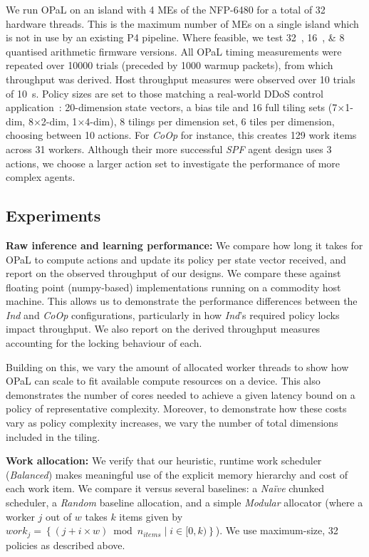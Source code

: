 \documentclass[sigconf,natbib=false]{acmart}
\newcommand{\fakepara}[1]{\noindent\textbf{#1:}}
\newcommand{\approachshort}{OPaL}
\newcommand{\Coopfw}{\emph{CoOp}}
\newcommand{\coopfw}{\Coopfw}
\newcommand{\Indfw}{\emph{Ind}}
\newcommand{\indfw}{\Indfw}
\begin{document}
We run \approachshort{} on an island with \num{4} MEs of the NFP-6480 for a total of \num{32} hardware threads.
This is the maximum number of MEs on a single island which is not in use by an existing P4 pipeline.
Where feasible, we test \SIlist{32;16;8}{\bit} quantised arithmetic firmware versions.
All \approachshort{} timing measurements were repeated over \num{10000} trials (preceded by \num{1000} warmup packets), from which throughput was derived.
Host throughput measures were observed over \num{10} trials of \SI{10}{\second}.
Policy sizes are set to those matching a real-world DDoS control application~\parencite{DBLP:journals/tnsm/SimpsonRP20}: 20-dimension state vectors, a bias tile and 16 full tiling sets (7$\times$1-dim, 8$\times$2-dim, 1$\times$4-dim), 8 tilings per dimension set, 6 tiles per dimension, choosing between 10 actions.
For \Coopfw{} for instance, this creates \num{129} work items across \num{31} workers.
Although their more successful \emph{SPF} agent design uses 3 actions, we choose a larger action set to investigate the performance of more complex agents.

\subsection{Experiments}

\fakepara{Raw inference and learning performance}
We compare how long it takes for \approachshort{} to compute actions and update its policy per state vector received, and report on the observed throughput of our designs.
We compare these against floating point (numpy-based) implementations running on a commodity host machine.
This allows us to demonstrate the performance differences between the \indfw{} and \coopfw{} configurations, particularly in how \indfw's required policy locks impact throughput.
We also report on the derived throughput measures accounting for the locking behaviour of each.

Building on this, we vary the amount of allocated worker threads to show how \approachshort{} can scale to fit available compute resources on a device.
This also demonstrates the number of cores needed to achieve a given latency bound on a policy of representative complexity.
Moreover, to demonstrate how these costs vary as policy complexity increases, we vary the number of total dimensions included in the tiling.

\fakepara{Work allocation}
We verify that our heuristic, runtime work scheduler (\emph{Balanced}) makes meaningful use of the explicit memory hierarchy and cost of each work item.
We compare it versus several baselines: a \emph{Na\"{i}ve} chunked scheduler, a \emph{Random} baseline allocation, and a simple \emph{Modular} allocator (where a worker $j$ out of $w$ takes $k$ items given by $\mathit{work}_j=\left\{\left(j + i \times w\right) \bmod n_{\mathit{items}} \mid i \in [0,k) \right\}$).
We use maximum-size, \SI{32}{\bit} policies as described above.
\end{document}
